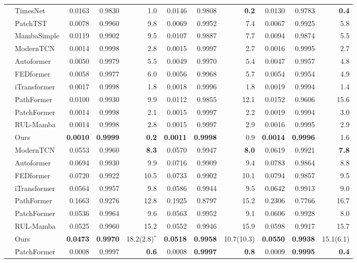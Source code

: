 \documentclass[final,5p,times,twocolumn]{elsarticle}
\begin{document}
\begin{table}[!t]
\begin{tabular}{@{}ll rrr rrr rrr@{}}
  & TimesNet & 0.0163 &0.9830&1.0& 0.0146 &0.9808&\textbf{0.2}& 0.0130 &0.9783&\textbf{0.4} \\
  & PatchTST & 0.0078 &0.9960&9.8& 0.0069 &0.9952&7.4& 0.0067 &0.9925&5.8 \\
  & MambaSimple & 0.0119 &0.9902&9.5& 0.0107 &0.9887&7.7& 0.0094 &0.9874&5.5 \\
  & ModernTCN & 0.0014 &0.9998&2.8& 0.0015 &0.9997&2.7& 0.0016 &0.9995&2.7 \\
  & Autoformer & 0.0050 &0.9979&5.5& 0.0049 &0.9970&5.4& 0.0047 &0.9957&4.8 \\
  & FEDformer & 0.0058 &0.9977&6.0& 0.0056 &0.9968&5.7& 0.0054 &0.9954&4.9 \\
  & iTransformer & 0.0017 &0.9998&1.8& 0.0018 &0.9996&1.8& 0.0019 &0.9994&1.4 \\
  & PathFormer & 0.0100 &0.9930&9.9& 0.0112 &0.9855&12.1& 0.0152 &0.9606&15.6 \\
  & PatchFormer & 0.0014 &0.9998&2.1& 0.0015 &0.9997&2.2& 0.0019 &0.9994&3.0 \\
  & RUL-Mamba & 0.0014 &0.9998&2.8& 0.0015 &0.9997&2.9& 0.0016 &0.9995&2.9 \\
  & Ours &\textbf{0.0010}&\textbf{0.9999}&\textbf{0.2}&\textbf{0.0011}&\textbf{0.9998}&0.9&\textbf{0.0014}&\textbf{0.9996}&1.6 \\
\midrule
{} & ModernTCN & 0.0553 &0.9960&\textbf{8.3}& 0.0570 &0.9947&\textbf{8.0}& 0.0619 &0.9921&\textbf{7.8} \\
  & Autoformer & 0.0694 &0.9930&9.9& 0.0716 &0.9909&9.4& 0.0783 &0.9864&8.8 \\
  & FEDformer & 0.0720 &0.9922&10.5& 0.0733 &0.9902&10.1& 0.0794 &0.9857&9.5 \\
  & iTransformer & 0.0564 &0.9957&9.8& 0.0586 &0.9944&9.5& 0.0642 &0.9913&9.0 \\
  & PathFormer & 0.1663 &0.9276&12.8& 0.1925 &0.8797&15.2& 0.2306 &0.7766&16.7 \\
  & PatchFormer & 0.0536 &0.9964&9.6& 0.0563 &0.9952&9.1& 0.0606 &0.9928&8.0 \\
  & RUL-Mamba & 0.0525 &0.9960&15.2& 0.0552 &0.9946&15.9& 0.0598 &0.9917&15.7 \\
  & Ours &\textbf{0.0473}&\textbf{0.9970}&18.2\;(2.8)$^{\ast}$&\textbf{0.0518}&\textbf{0.9958}&10.7\;(10.3)&\textbf{0.0550}&\textbf{0.9938}&15.1\;(6.1) \\
\midrule
{} & PatchFormer & 0.0008 &0.9997&\textbf{0.6}& 0.0008 &\textbf{0.9997}&\textbf{0.8}& 0.0009 &\textbf{0.9995}&\textbf{0.4} \\

\end{tabular}
\end{table}
\end{document}
